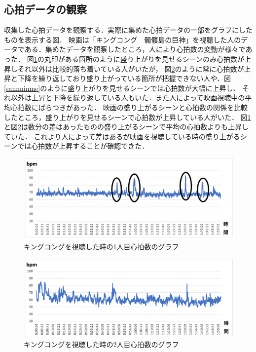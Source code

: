 \subsection{心拍データの観察}

収集した心拍データを観察する．実際に集めた心拍データの一部をグラフにしたものを表示する図．
映画は「キングコング　髑髏島の巨神」を視聴した人のデータである．集めたデータを観察したところ，人により心拍数の変動が様々であった．
図\ref{hitorime}の丸印がある箇所のように盛り上がりを見せるシーンのみ心拍数が上昇しそれ以外は比較的落ち着いている人がいたが，
図\ref{futarime}のように常に心拍数が上昇と下降を繰り返しており盛り上がっている箇所が把握できない人や、図\ref{sannninme}のように盛り上がりを見せるシーンでは心拍数が大幅に上昇し、
それ以外は上昇と下降を繰り返している人もいた．また人によって映画視聴中の平均心拍数にばらつきがあった．
映画の盛り上がるシーンと心拍数の関係を比較したところ，盛り上がりを見せるシーンで心拍数が上昇している人がいた．
図\ref{hitorime}と図\ref{futarime}は数分の差はあったものの盛り上がるシーンで平均の心拍数よりも上昇していた．
これより人によって差はあるが映画を視聴している時の盛り上がるシーンでは心拍数が上昇することが確認できた．

\begin{figure}[H]
    \centering
    \includegraphics[width=16cm]{images/chapter3/gurafusyuusei.png}
    \caption{キングコングを視聴した時の1人目心拍数のグラフ}
    \label{hitorime}
\end{figure}

\begin{figure}[H]
    \centering
    \includegraphics[width=16cm]{images/chapter3/gurafu.png}
    \caption{キングコングを視聴した時の2人目心拍数のグラフ}
    \label{futarime}
\end{figure}

